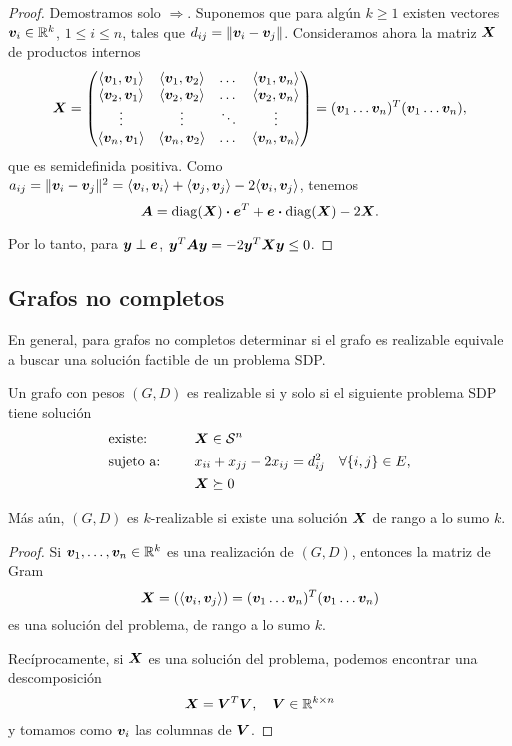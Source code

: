 \begin{proof}
Demostramos solo $\Rightarrow$. 
Suponemos que para algún $k \ge 1$ existen vectores $\bm{v}_i \in \mathbb{R}^k$, $1 \le i \le n$, tales que $d_{ij} = \|\bm{v}_i - \bm{v}_j\|$. Consideramos ahora la matriz $\bm{X}$ de productos internos
$$
\Xb = \begin{pmatrix}
\innerl{\vb_1}{\vb_1} & \innerl{\vb_1}{\vb_2} & \dots & \innerl{\vb_1}{\vb_n} \\
\innerl{\vb_2}{\vb_1} & \innerl{\vb_2}{\vb_2} & \dots & \innerl{\vb_2}{\vb_n} \\
\vdots & \vdots & \ddots & \vdots \\
\innerl{\vb_n}{\vb_1} & \innerl{\vb_n}{\vb_2} & \dots & \innerl{\vb_n}{\vb_n}
\end{pmatrix} = (\vb_1 \dots \vb_n)^T (\vb_1 \dots \vb_n),
$$
que es semidefinida positiva. Como $a_{ij} = \| \bm{v}_i - \bm{v}_j\|^2 = \langle \bm{v}_i, \bm{v}_i \rangle + \langle \bm{v}_j, \bm{v}_j \rangle - 2 \langle \bm{v}_i, \bm{v}_j \rangle$, tenemos
$$
\bm{A} = \operatorname{diag}(\bm{X}) \boldsymbol{\cdot} \bm{e}^T + \bm{e} \boldsymbol{\cdot} \operatorname{diag}(\bm{X}) - 2 \bm{X}.
$$

Por lo tanto, para $\bm{y} \perp \bm{e}$, $\bm{y}^T \bm{A} \bm{y} = -2 \bm{y}^T \bm{X} \bm{y} \le 0$.

\end{proof}

\subsection{Grafos no completos}

En general, para grafos no completos determinar si el grafo es realizable equivale a buscar una solución factible de un problema SDP.

\begin{theorem}
Un grafo con pesos $(G, D)$ es realizable si y solo si el siguiente problema SDP tiene solución
\begin{alignat*}{2}
  & \text{existe: } & & \bm{X} \in {\mathcal S}^n \\
   & \text{sujeto a: } & \quad & x_{ii} + x_{jj} - 2 x_{ij} = d_{ij}^2 \quad \forall \{i, j\} \in E, \\
   &&& \bm{X}  \succeq 0
\end{alignat*}

Más aún, $(G, D)$ es $k$-realizable si existe una solución $\bm{X}$ de rango a lo sumo $k$.
\end{theorem}

\begin{proof}
Si $\bm{v}_1, \dots, \bm{v}_n \in \mathbb{R}^k$ es una realización de $(G, D)$, entonces la matriz de Gram
$$
\Xb = (\innerl{\vb_i}{\vb_j}) = (\vb_1 \dots \vb_n)^T (\vb_1 \dots \vb_n)
$$
es una solución del problema, de rango a lo sumo $k$.

Recíprocamente, si $\bm{X}$ es una solución del problema, podemos encontrar una descomposición
$$
\bm{X} = \bm{V}^T \bm{V}, \quad \bm{V} \in \mathbb{R}^{k \times n}
$$
y tomamos como $\bm{v}_i$ las columnas de $\bm{V}$.
\end{proof}

